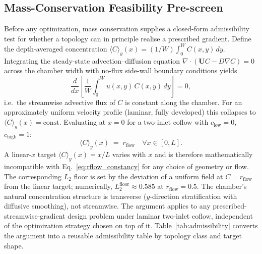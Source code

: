 \documentclass[12pt]{article}
\begin{document}
\subsection{Mass-Conservation Feasibility Pre-screen}
\label{sec:mass_conservation}
Before any optimization, mass conservation supplies a closed-form admissibility test for whether a topology can in principle realise a prescribed gradient. Define the depth-averaged concentration $\langle C \rangle_y(x) = (1/W)\int_0^W C(x,y)\, dy$. Integrating the steady-state advection--diffusion equation $\nabla \cdot (\mathbf{U}C - D\nabla C) = 0$ across the chamber width with no-flux side-wall boundary conditions yields
\begin{equation}
\frac{d}{dx}\!\left[\frac{1}{W}\!\int_0^W u(x,y)\, C(x,y)\, dy\right] = 0,
\label{eq:mc_constancy}
\end{equation}
i.e.\ the streamwise advective flux of $C$ is constant along the chamber. For an approximately uniform velocity profile (laminar, fully developed) this collapses to $\langle C \rangle_y(x) = \text{const}$. Evaluating at $x=0$ for a two-inlet coflow with $c_{\text{low}} = 0$, $c_{\text{high}} = 1$:
\begin{equation}
\langle C \rangle_y(x) \;=\; r_{\text{flow}} \quad \forall x \in [0, L].
\label{eq:rflow_constancy}
\end{equation}
A linear-$x$ target $\langle C \rangle_y(x) = x/L$ varies with $x$ and is therefore mathematically incompatible with Eq.~\ref{eq:rflow_constancy} for any choice of geometry or flow. The corresponding $L_2$ floor is set by the deviation of a uniform field at $C = r_{\text{flow}}$ from the linear target; numerically, $L_2^{\text{floor}} \approx 0.585$ at $r_{\text{flow}} = 0.5$. The chamber's natural concentration structure is transverse ($y$-direction stratification with diffusive smoothing), not streamwise. The argument applies to any prescribed-streamwise-gradient design problem under laminar two-inlet coflow, independent of the optimization strategy chosen on top of it. Table~\ref{tab:admissibility} converts the argument into a reusable admissibility table by topology class and target shape.
\end{document}
